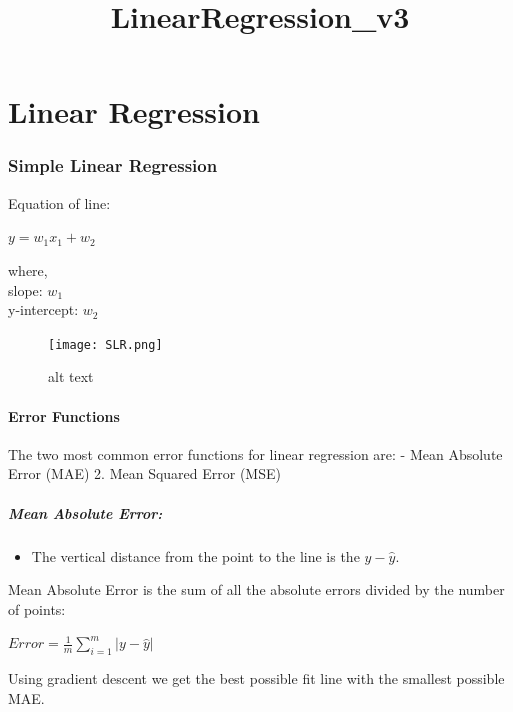 \documentclass[11pt]{article}
\title{LinearRegression\_v3}
\providecommand{\tightlist}{%
      \setlength{\itemsep}{0pt}\setlength{\parskip}{0pt}}
\begin{document}
    
    
    \maketitle
    
    

    
    \hypertarget{linear-regression}{%
\section{Linear Regression}\label{linear-regression}}

    \hypertarget{simple-linear-regression}{%
\subsubsection{Simple Linear
Regression}\label{simple-linear-regression}}

Equation of line:

\(y = w_1x_1 + w_2\)

where,\\
slope: \(w_1\)\\
y-intercept: \(w_2\)

\begin{figure}
\centering
\texttt{[image: SLR.png]}
\caption{alt text}
\end{figure}

    \hypertarget{error-functions}{%
\paragraph{Error Functions}\label{error-functions}}

The two most common error functions for linear regression are: - Mean
Absolute Error (MAE) 2. Mean Squared Error (MSE)

\hypertarget{mean-absolute-error}{%
\subparagraph{Mean Absolute Error:}\label{mean-absolute-error}}

\begin{itemize}
\tightlist
\item
  The vertical distance from the point to the line is the
  \(y - \hat{y}.\)
\end{itemize}

Mean Absolute Error is the sum of all the absolute errors divided by the
number of points:

\(Error = \frac{1}{m} \sum_{i=1}^{m} |y - \hat{y}|\)

Using gradient descent we get the best possible fit line with the
smallest possible MAE.
\end{document}
